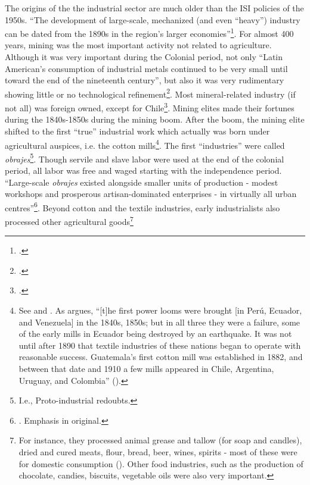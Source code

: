 \documentclass[onesided]{article}\usepackage[]{graphicx}\usepackage[]{color}
\begin{document}
The origins of the the industrial sector are much older than the ISI policies of the 1950s. ``The development of large-scale, mechanized (and even ``heavy'') industry can be dated from the 1890s in the region's larger economies''\footnote{\citet[p. 2]{Haber2005}.}. For almost 400 years, mining was the most important activity not related to agriculture. Although it was very important during the Colonial period, not only ``Latin American's consumption of industrial metals continued to be very small until toward the end of the nineteenth century'', but also it was very rudimentary showing little or no technological refinement\footnote{\citet[p. 230]{Rippy:1971rz}.}. Most mineral-related industry (if not all) was foreign owned, except for Chile\footnote{\citet[p. 165, 176, footnote 5, 324]{Rueschemeyer:1992}.}. Mining elites made their fortunes during the 1840s-1850s during the mining boom. After the boom, the mining elite shifted to the first ``true'' industrial work which actually was  born under agricultural auspices, i.e. the cotton mills\footnote{
	See \citet[p. 231]{Rippy:1971rz} and \citet[p. 271]{Bethell2008}. As \citet[p. 271]{Bethell2008} argues, ``[t]he first power looms were brought [in Per\'u, Ecuador, and Venezuela] in the 1840s, 1850s; but in all three they were a failure, some of the early mills in Ecuador being destroyed by an earthquake. It was not until after 1890 that textile industries of these nations began to operate with reasonable success. Guatemala's first cotton mill was established in 1882, and between that date and 1910 a few mills appeared in Chile, Argentina, Uruguay, and Colombia'' (\citet[p. 232]{Rippy:1971rz}).
	}. The first ``industries'' were called  \emph{obrajes}\footnote{I.e., Proto-industrial redoubts.}. Though servile and slave labor were used at the end of the colonial period, all labor was free and waged starting with the independence period. ``Large-scale \emph{obrajes} existed alongside smaller units of production - modest workshops and prosperous artisan-dominated enterprises -  in virtually all urban centres''\footnote{\citet[p. 271]{Bethell2008}. Emphasis in original.}. Beyond cotton and the textile industries, early industrialists also processed other agricultural goods\footnote{
	For instance, they processed animal grease and tallow (for soap and candles), dried and cured meats, flour, bread, beer, wines, spirits - most of these were for domestic consumption (\citet[p. 272]{Bethell2008}). Other food industries, such as the production of chocolate, candies, biscuits, vegetable oils were also very important.
}
\end{document}
